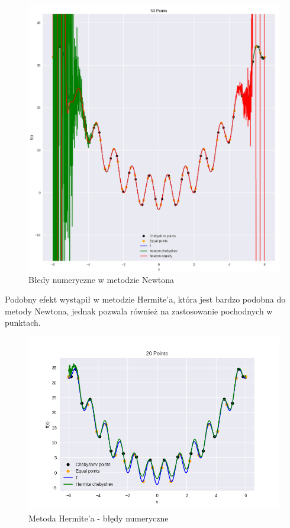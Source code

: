 \documentclass{article}
\begin{document}
\begin{figure}[H]
    \centering
    \includegraphics[width=\textwidth]{img/newt_50.png}
    \caption{Błedy numeryczne w metodzie Newtona}
\end{figure}

Podobny efekt wystąpił w metodzie Hermite'a, która jest bardzo podobna do metody Newtona, jednak pozwala również na zastosowanie
pochodnych w punktach.

\begin{figure}[H]
    \centering
    \includegraphics[width=\textwidth]{img/herm_20.png}
    \caption{Metoda Hermite'a - błędy numeryczne}
\end{figure}
\end{document}
